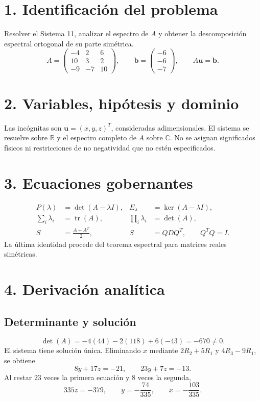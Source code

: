 \documentclass[spanish,letterpaper,oneside]{article}
\begin{document}
\section*{1. Identificación del problema}
Resolver el Sistema 11, analizar el espectro de $A$ y obtener la descomposición espectral ortogonal de su parte simétrica.
\begin{equation}
A=\begin{pmatrix}-4&2&6\\10&3&2\\-9&-7&10\end{pmatrix},\qquad
\mathbf{b}=\begin{pmatrix}-6\\-6\\-7\end{pmatrix},\qquad
A\mathbf{u}=\mathbf{b}.
\end{equation}

\section*{2. Variables, hipótesis y dominio}
Las incógnitas son $\mathbf{u}=(x,y,z)^T$, consideradas adimensionales. El sistema se resuelve sobre $\mathbb{R}$ y el espectro completo de $A$ sobre $\mathbb{C}$. No se asignan significados físicos ni restricciones de no negatividad que no estén especificados.

\section*{3. Ecuaciones gobernantes}
\begin{align}
P(\lambda)&=\det(A-\lambda I),& E_\lambda&=\ker(A-\lambda I),\\
\sum_i\lambda_i&=\operatorname{tr}(A),&\prod_i\lambda_i&=\det(A),\\
S&=\frac{A+A^T}{2},&S&=QDQ^T,\qquad Q^TQ=I.
\end{align}
La última identidad procede del teorema espectral para matrices reales simétricas.

\section*{4. Derivación analítica}
\subsection*{Determinante y solución}
\begin{equation}
\det(A)=-4(44)-2(118)+6(-43)=-670\ne0.
\end{equation}
El sistema tiene solución única. Eliminando $x$ mediante $2R_2+5R_1$ y $4R_3-9R_1$, se obtiene
\begin{equation}
8y+17z=-21,\qquad23y+7z=-13.
\end{equation}
Al restar $23$ veces la primera ecuación y $8$ veces la segunda,
\begin{equation}
335z=-379,\qquad y=-\frac{74}{335},\qquad x=-\frac{103}{335}.
\end{equation}
\end{document}
